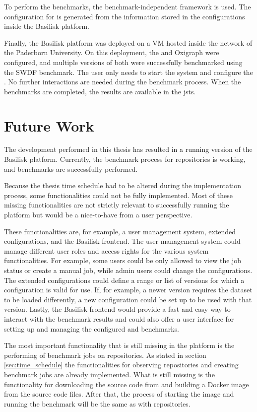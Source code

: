 To perform the benchmarks, the benchmark-independent \iguana{} framework is used.
The configuration for \iguana{} is generated from the information stored in the \ts{} configurations inside the Basilisk platform.

Finally, the Basilisk platform was deployed on a VM hosted inside the network of the Paderborn University.
On this deployment, the \tentris{} and Oxigraph \tsp{} were configured, and multiple versions of both \tsp{} were successfully benchmarked using the SWDF benchmark.
The user only needs to start the system and configure the \tsp{}.
No further interactions are needed during the benchmark process.
When the benchmarks are completed, the results are available in the \acl{jsts}.



\section{Future Work}
\label{sec:future_work}
The development performed in this thesis has resulted in a running version of the Basilisk platform.
Currently, the benchmark process for \dockh{} repositories is working, and benchmarks are successfully performed.

Because the thesis time schedule had to be altered during the implementation process, some functionalities could not be fully implemented.
Most of these missing functionalities are not strictly relevant to successfully running the platform but would be a nice-to-have from a user perspective.

These functionalities are, for example, a user management system, extended \ts{} configurations, and the Basilisk frontend.
The user management system could manage different user roles and access rights for the various system functionalities.
For example, some users could be only allowed to view the job status or create a manual job, while admin users could change the \ts{} configurations.
The extended \ts{} configurations could define a range or list of versions for which a configuration is valid for use.
If, for example, a newer \ts{} version requires the dataset to be loaded differently, a new configuration could be set up to be used with that version.
Lastly, the Basilisk frontend would provide a fast and easy way to interact with the benchmark results and could also offer a user interface for setting up and managing the configured \ts{} and benchmarks.

The most important functionality that is still missing in the platform is the performing of benchmark jobs on \gh{} repositories.
As stated in section \ref{sec:time_schedule} the functionalities for observing \gh{} repositories and creating benchmark jobs are already implemented.
What is still missing is the functionality for downloading the source code from \gh{} and building a Docker image from the source code files.
After that, the process of starting the image and running the benchmark will be the same as with \dockh{} repositories.





